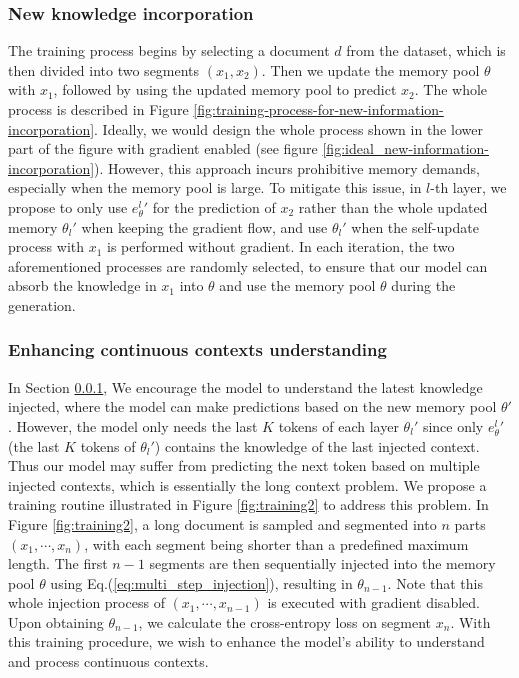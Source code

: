 \documentclass{article}
\theoremstyle{plain}
\theoremstyle{definition}
\theoremstyle{remark}
\begin{document}
\subsubsection{New knowledge incorporation}
\label{ssub:newest_information_incorporation}
The training process begins by selecting a document $d$ from the dataset, which is then divided into two segments $(x_1, x_2)$. 
Then we update the memory pool $\theta$ with $x_1$, followed by using the updated memory pool to predict $x_2$. 
The whole process is described in Figure \ref{fig:training-process-for-new-information-incorporation}. Ideally, we would design the whole process shown in the lower part of the figure with gradient enabled (see figure \ref{fig:ideal_new-information-incorporation}). 
However, this approach incurs prohibitive memory demands, especially when the memory pool is large. To mitigate this issue,
in $l$-th layer, we propose to only use ${e_\theta^l}'$ for the prediction of $x_2$ rather than the whole updated memory $\theta_l'$ when keeping the gradient flow, and use $\theta_l'$ when the self-update process with $x_1$ is performed without gradient.
In each iteration, the two aforementioned processes are randomly selected, to ensure that our model can absorb the knowledge in $x_1$ into $\theta$ and use the memory pool $\theta$ during the generation. 
\subsubsection{Enhancing continuous contexts understanding} 
\label{ssub:enhancing_continuous_contexts_understanding}
In Section \ref{ssub:newest_information_incorporation}, 
We encourage the model to understand the latest knowledge injected, where the model can make predictions based on the new memory pool $\theta'$. 
However, the model only needs the last $K$ tokens of each layer $\theta_l'$ since only ${e_\theta^{l}}'$ (the last $K$ tokens of $\theta_l'$) contains the knowledge of the last injected context. 
Thus our model may suffer from predicting the next token based on multiple injected contexts, which is essentially the long context problem. 
We propose a training routine illustrated in Figure \ref{fig:training2} to address this problem. In Figure \ref{fig:training2}, a long document is sampled and segmented into $n$ parts $(x_1, \cdots, x_n)$, with each segment being shorter than a predefined maximum length. 
The first $n-1$ segments are then sequentially injected into the memory pool $\theta$ using Eq.(\ref{eq:multi_step_injection}), resulting in $\theta_{n-1}$.
Note that this whole injection process of $(x_1, \cdots, x_{n-1})$ is executed with gradient disabled. 
Upon obtaining $\theta_{n-1}$, we calculate the cross-entropy loss on segment $x_n$. With this training procedure, we wish to enhance the model's ability to understand and process continuous contexts.
\end{document}
